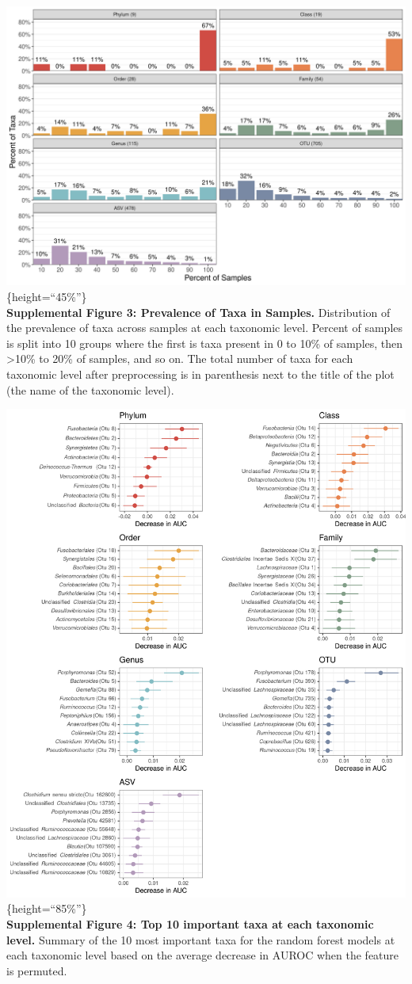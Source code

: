 \documentclass[]{article}
\begin{document}
\newpage  

\includegraphics{figure_s3.png}\{height=``45\%''\}\\\textbf{Supplemental
Figure 3: Prevalence of Taxa in Samples.} Distribution of the prevalence
of taxa across samples at each taxonomic level. Percent of samples is
split into 10 groups where the first is taxa present in 0 to 10\% of
samples, then \textgreater{}10\% to 20\% of samples, and so on. The
total number of taxa for each taxonomic level after preprocessing is in
parenthesis next to the title of the plot (the name of the taxonomic
level).

\newpage

\includegraphics{figure_s4.png}\{height=``85\%''\}\\\textbf{Supplemental
Figure 4: Top 10 important taxa at each taxonomic level.} Summary of the
10 most important taxa for the random forest models at each taxonomic
level based on the average decrease in AUROC when the feature is
permuted.
\end{document}
